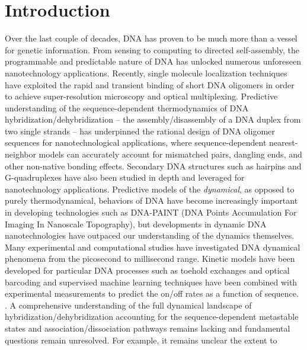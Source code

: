 \documentclass[journal=jpcbfk,manuscript=article]{achemso}
\begin{document}

\newpage

\section{\label{sec:intro}Introduction}

Over the last couple of decades, DNA has proven to be much more than a vessel for genetic information. From sensing to computing to directed self-assembly, the programmable and predictable nature of DNA has unlocked numerous unforeseen nanotechnology applications.\citep{Seeman2017DNANanotechnology, Adleman1994MolecularProblems, Rothemund2006FoldingPatterns, Gu2010ALine} Recently, single molecule localization techniques have exploited the rapid and transient binding of short DNA oligomers in order to achieve super-resolution microscopy and optical multiplexing. \cite{Schnitzbauer2017Super-resolutionDNA-PAINT, Shah2019, Strauss2020UpDNA-PAINT} Predictive understanding of the sequence-dependent thermodynamics of DNA hybridization/dehybridization -- the assembly/disassembly of a DNA duplex from two single strands -- has underpinned the rational design of DNA oligomer sequences for nanotechnological applications, where sequence-dependent nearest-neighbor models can accurately account for mismatched pairs, dangling ends, and other non-native bonding effects.\citep{SantaLucia1998AThermodynamics, Santalucia2004TM} Secondary DNA structures such as hairpins and G-quadruplexes have also been studied in depth and leveraged for nanotechnology applications.\citep{Tsukanov2013DetailedOrigami, Mosayebi2014TheFormation, Mergny2019DNANanotechnology} Predictive models of the \textit{dynamical}, as opposed to purely thermodynamical, behaviors of DNA have become increasingly important in developing technologies such as DNA-PAINT (DNA Points Accumulation For Imaging In Nanoscale Topography), but developments in dynamic DNA nanotechnologies have outpaced our understanding of the dynamics themselves. \citep{Deluca2020DynamicDevices, Cordes2010SensingTransfer, Naimark2020DNADevelopment} Many experimental and computational studies have investigated DNA dynamical phenomena from the picosecond to millisecond range.\citep{Yin2011KineticsHybridization, Xiao2019, Hinckley2014Coarse-grainedEffects, Sanstead2016, Porschke1971CooperativeTransition} Kinetic models have been developed for particular DNA processes such as toehold exchanges and optical barcoding \citep{Zhang2009ControlExchange, Shah2019ProgrammingFingerprinting} and supervised machine learning techniques have been combined with experimental measurements to predict the on/off rates as a function of sequence. \citep{Schickinger2018TetheredHelices, Zhang2018PredictingSequence, Shah2019}. A comprehensive understanding of the full dynamical landscape of hybridization/dehybridization accounting for the sequence-dependent metastable states and association/dissociation pathways remains lacking and fundamental questions remain unresolved. For example, it remains unclear the extent to 
\end{document}

